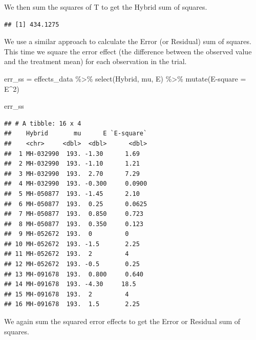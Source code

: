 \documentclass[
]{book}
\newenvironment{Shaded}{\begin{snugshade}}{\end{snugshade}}
\newcommand{\AttributeTok}[1]{\textcolor[rgb]{0.77,0.63,0.00}{#1}}
\newcommand{\DecValTok}[1]{\textcolor[rgb]{0.00,0.00,0.81}{#1}}
\newcommand{\FunctionTok}[1]{\textcolor[rgb]{0.00,0.00,0.00}{#1}}
\newcommand{\NormalTok}[1]{#1}
\newcommand{\OtherTok}[1]{\textcolor[rgb]{0.56,0.35,0.01}{#1}}
\newcommand{\SpecialCharTok}[1]{\textcolor[rgb]{0.00,0.00,0.00}{#1}}
\newcommand{\StringTok}[1]{\textcolor[rgb]{0.31,0.60,0.02}{#1}}
\begin{document}
We then sum the squares of T to get the Hybrid sum of squares.

\begin{Shaded}
\end{Shaded}

\begin{verbatim}
## [1] 434.1275
\end{verbatim}

We use a similar approach to calculate the Error (or Residual) sum of squares. This time we square the error effect (the difference between the observed value and the treatment mean) for each observation in the trial.

\begin{Shaded}
\begin{Highlighting}[]
\NormalTok{err\_ss }\OtherTok{=}\NormalTok{ effects\_data }\SpecialCharTok{\%\textgreater{}\%}
  \FunctionTok{select}\NormalTok{(Hybrid, mu, E) }\SpecialCharTok{\%\textgreater{}\%}
  \FunctionTok{mutate}\NormalTok{(}\StringTok{\textasciigrave{}}\AttributeTok{E{-}square}\StringTok{\textasciigrave{}} \OtherTok{=}\NormalTok{ E}\SpecialCharTok{\^{}}\DecValTok{2}\NormalTok{)}

\NormalTok{err\_ss}
\end{Highlighting}
\end{Shaded}

\begin{verbatim}
## # A tibble: 16 x 4
##    Hybrid       mu      E `E-square`
##    <chr>     <dbl>  <dbl>      <dbl>
##  1 MH-032990  193. -1.30      1.69  
##  2 MH-032990  193. -1.10      1.21  
##  3 MH-032990  193.  2.70      7.29  
##  4 MH-032990  193. -0.300     0.0900
##  5 MH-050877  193. -1.45      2.10  
##  6 MH-050877  193.  0.25      0.0625
##  7 MH-050877  193.  0.850     0.723 
##  8 MH-050877  193.  0.350     0.123 
##  9 MH-052672  193.  0         0     
## 10 MH-052672  193. -1.5       2.25  
## 11 MH-052672  193.  2         4     
## 12 MH-052672  193. -0.5       0.25  
## 13 MH-091678  193.  0.800     0.640 
## 14 MH-091678  193. -4.30     18.5   
## 15 MH-091678  193.  2         4     
## 16 MH-091678  193.  1.5       2.25
\end{verbatim}

We again sum the squared error effects to get the Error or Residual sum of squares.
\end{document}
